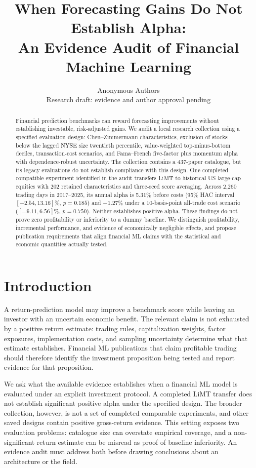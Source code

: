\documentclass{article}
\title{When Forecasting Gains Do Not Establish Alpha:\\An Evidence Audit of Financial Machine Learning}
\author{Anonymous Authors\\Research draft: evidence and author approval pending}
\begin{document}
\raggedbottom
\maketitle

\begin{abstract}
Financial prediction benchmarks can reward forecasting improvements without establishing investable, risk-adjusted gains. We audit a local research collection using a specified evaluation design: Chen--Zimmermann characteristics, exclusion of stocks below the lagged NYSE size twentieth percentile, value-weighted top-minus-bottom deciles, transaction-cost scenarios, and Fama--French five-factor plus momentum alpha with dependence-robust uncertainty. The collection contains a 437-paper catalogue, but its legacy evaluations do not establish compliance with this design. One completed compatible experiment identified in the audit transfers LiMT to historical US large-cap equities with 202 retained characteristics and three-seed score averaging. Across 2,260 trading days in 2017--2025, its annual alpha is 5.31\% before costs (95\% HAC interval $[-2.54,13.16]$\%, $p=0.185$) and $-1.27$\% under a 10-basis-point all-trade cost scenario ($[-9.11,6.56]$\%, $p=0.750$). Neither establishes positive alpha. These findings do not prove zero profitability or inferiority to a dummy baseline. We distinguish profitability, incremental performance, and evidence of economically negligible effects, and propose publication requirements that align financial ML claims with the statistical and economic quantities actually tested.
\end{abstract}

\section{Introduction}
A return-prediction model may improve a benchmark score while leaving an investor with an uncertain economic benefit. The relevant claim is not exhausted by a positive return estimate: trading rules, capitalization weights, factor exposures, implementation costs, and sampling uncertainty determine what that estimate establishes. Financial ML publications that claim profitable trading should therefore identify the investment proposition being tested and report evidence for that proposition.

We ask what the available evidence establishes when a financial ML model is evaluated under an explicit investment protocol. A completed LiMT transfer does not establish significant positive alpha under the specified design. The broader collection, however, is not a set of completed comparable experiments, and other saved designs contain positive gross-return evidence. This setting exposes two evaluation problems: catalogue size can overstate empirical coverage, and a non-significant return estimate can be misread as proof of baseline inferiority. An evidence audit must address both before drawing conclusions about an architecture or the field.
\end{document}
